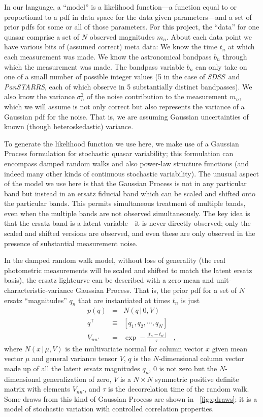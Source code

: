 \documentclass[letterpaper,12pt,preprint]{aastex}
\newcommand{\project}[1]{\textsl{#1}}
\newcommand{\sdss}{\project{SDSS}}
\newcommand{\panstarrs}{\project{PanSTARRS}}
\newcommand{\given}{\,|\,}
\newcommand{\transpose}[1]{{#1}^{\mathsf{T}}}
\begin{document}
In our language, a ``model'' is a likelihood function---a function
equal to or proportional to a pdf in data space for the data given
parameters---and a set of prior pdfs for some or all of those
parameters.  For this project, the ``data'' for one quasar comprise a
set of $N$ observed magnitudes $m_n$.  About each data point we have
various bits of (assumed correct) meta data: We know the time $t_n$ at
which each measurement was made.  We know the astronomical bandpass
$b_n$ through which the measurement was made.  The bandpass variable
$b_n$ can only take on one of a small number of possible integer
values (5 in the case of \sdss\ and \panstarrs, each of which observe
in 5 substantially distinct bandpasses).  We also know the variance
$\sigma_n^2$ of the noise contribution to the measurement $m_n$, which
we will assume is not only correct but also represents the variance of
a Gaussian pdf for the noise.  That is, we are assuming Gaussian
uncertainties of known (though heteroskedastic) variance.

To generate the likelihood function we use here, we make
use of a Gaussian Process formulation for stochastic quasar
variability; this formulation can encompass damped random walks
and also power-law structure functions (and indeed many other kinds of
continuous stochastic variability).  The unusual aspect of the model
we use here is that the Gaussian Process is not in any particular band
but instead in an ersatz fiducial band which can be scaled and shifted
onto the particular bands.  This permits simultaneous treatment of
multiple bands, even when the multiple bands are not observed
simultaneously.  The key idea is that the ersatz band is a latent
variable---it is never directly observed; only the scaled and shifted
versions are observed, and even these are only observed in the
presence of substantial measurement noise.

In the damped random walk model, without loss of generality (the real
photometric measurements will be scaled and shifted to match the
latent ersatz basis), the ersatz lightcurve can be described with a
zero-mean and unit-characteristic-variance Gaussian Process.  That is,
the prior pdf for a set of $N$ ersatz ``magnitudes'' $q_n$ that are
instantiated at times $t_n$ is just
\begin{eqnarray}
p(q) &=& N(q\given 0,V)
\\
\transpose{q} &\equiv& [q_1, q_2, \cdots , q_N]
\\
V_{nn'} &=& \exp -\frac{|t_n - t_{n'}|}{\tau}
\quad ,
\end{eqnarray}
where $N(x\given\mu,V)$ is the multivariate normal for column vector
$x$ given mean vector $\mu$ and general variance tensor $V$, $q$ is
the $N$-dimensional column vector made up of all the latent ersatz
magnitudes $q_n$, $0$ is not zero but the $N$-dimensional
generalization of zero, $V$ is a $N\times N$ symmetric positive
definite matrix with elements $V_{nn'}$, and $\tau$ is the
decorrelation time of the random walk.  Some draws from this kind of
Gaussian Process are shown in \figurename~\ref{fig:qdraws}; it is a
model of stochastic variation with controlled correlation properties.
\end{document}
